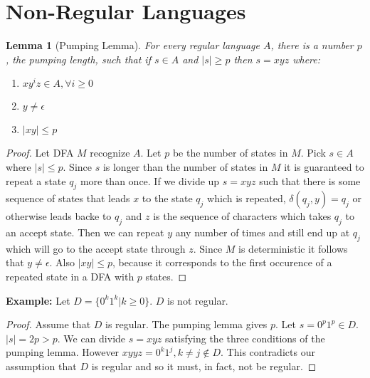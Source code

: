 \documentclass[12pt]{article}
\newtheorem{lemma}{Lemma}
\begin{document}
\section*{Non-Regular Languages}
\begin{lemma}[Pumping Lemma]
    For every regular language \(A\), there is a number \(p\), the pumping 
    length, such that if \(s \in A\) and \(|s| \geq p\) then \(s = xyz\) 
    where: 
    \begin{enumerate}
        \item \(xy^iz \in A, \forall i \geq 0\) 
        \item \(y \neq \epsilon\)
        \item \(|xy| \leq p\)
    \end{enumerate}
\end{lemma}
\begin{proof}
    Let DFA \(M\) recognize \(A\). Let \(p\) be the number of states in 
    \(M\). Pick \(s \in A\) where \(|s| \leq p\).
    Since \(s\) is longer than the number of states in \(M\) it is  
    guaranteed to repeat a state \(q_j\) more than once.
    If we divide up \(s = xyz\) such that there is some sequence of states 
    that leads \(x\) to the state \(q_j\) which is repeated, 
    \(\delta(q_j, y) = q_j\) or otherwise leads backe to \(q_j\) and \(z\) is 
    the sequence of characters which takes \(q_j\) to an accept state. 
    Then we can repeat \(y\) any number of times and still end up at \(q_j\) 
    which will go to the accept state through \(z\). Since \(M\) is deterministic 
    it follows that \(y \neq \epsilon\).  
    Also \(|xy| \leq p\), because it corresponds to the first occurence of a 
    repeated state in a DFA with \(p\) states.
    
\end{proof}

\noindent 
\textbf{Example:}
Let \(D = \{0^k1^k| k \geq 0\}\). \(D\) is not regular. 
\begin{proof}
    Assume that \(D\) is regular. The pumping lemma gives \(p\). 
    Let \(s = 0^p1^p \in D\). \(|s| = 2p > p\).
    We can divide \(s = xyz\) satisfying the three conditions of the pumping lemma. 
    However \(xyyz = 0^k1^j, k \neq j \not\in D\). This contradicts 
    our assumption that \(D\) is regular and so it must, in fact, not be regular.
\end{proof}
\end{document}
